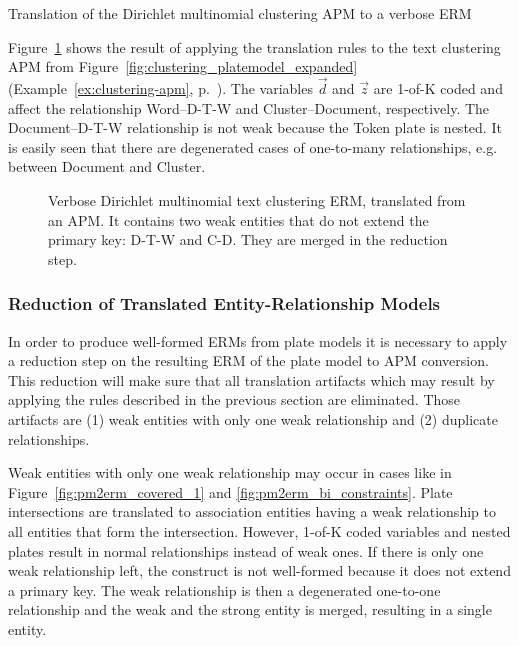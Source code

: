 \begin{Example} Translation of the Dirichlet multinomial clustering APM to a verbose ERM
\label{ex:clustering-erm-verbose}

Figure~\ref{fig:clustering_erm_good_verbose} shows the result of applying the translation rules to the text clustering APM from Figure~\ref{fig:clustering_platemodel_expanded} (Example~\ref{ex:clustering-apm}, p.~\pageref{ex:clustering-apm}). The variables $\vec d$ and $\vec z$ are 1-of-K coded and affect the relationship Word--D-T-W and Cluster--Document, respectively. The Document--D-T-W relationship is not weak because the Token plate is nested. It is easily seen that there are degenerated cases of one-to-many relationships, e.g. between Document and Cluster.

\end{Example}

\begin{figure}[h]
\centering
\scalebox{\tikzScale}{\adjustTikzSize }
\caption[Verbose Dirichlet multinomial text clustering ERM]{Verbose Dirichlet multinomial text clustering ERM, translated from an APM. It contains two weak entities that do not extend the primary key: D-T-W and C-D. They are merged in the reduction step.}\label{fig:clustering_erm_good_verbose}
\end{figure}

\subsubsection{Reduction of Translated Entity-Relationship Models}
\label{sec:erm_reduction}

In order to produce well-formed ERMs from plate models it is necessary to apply a reduction step on the resulting ERM of the plate model to APM conversion. This reduction will make sure that all translation artifacts which may result by applying the rules described in the previous section are eliminated. Those artifacts are (1) weak entities with only one weak relationship and (2) duplicate relationships.

Weak entities with only one weak relationship may occur in cases like in Figure~\ref{fig:pm2erm_covered_1} and \ref{fig:pm2erm_bi_constraints}. Plate intersections are translated to association entities having a weak relationship to all entities that form the intersection. However, 1-of-K coded variables and nested plates result in normal relationships instead of weak ones. If there is only one weak relationship left, the construct is not well-formed because it does not extend a primary key. The weak relationship is then a degenerated one-to-one relationship and the weak and the strong entity is merged, resulting in a single entity.

